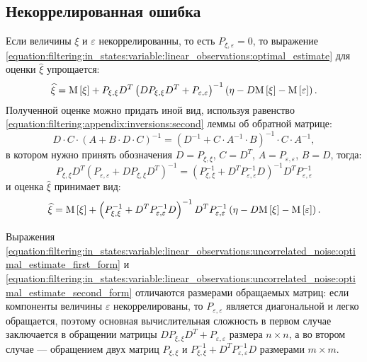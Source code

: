 \subsection{Некоррелированная ошибка}

Если величины $\xi$ и $\varepsilon$ некоррелированны, то есть $P_{\xi, \varepsilon} = 0$, то выражение
\eqref{equation:filtering:in_states:variable:linear_observations:optimal_estimate} для оценки $\widehat{\xi}$ упрощается:
\begin{gather} \label{equation:filtering:in_states:variable:linear_observations:uncorrelated_noise:optimal_estimate_first_form}
	\widehat{\xi}
		= \mathrm{M} \left [ \xi \right ]
		+ P_{\xi, \xi} D^T
			\left ( D P_{\xi, \xi} D^T + P_{\varepsilon, \varepsilon} \right )^{-1}
			\left ( \eta - D \mathrm{M} \left [ \xi \right ] - \mathrm{M} \left [ \varepsilon \right ] \right )
		.
\end{gather}
Полученной оценке можно придать иной вид, используя равенство \eqref{equation:filtering:appendix:inversions:second} леммы об обратной матрице:
$$
	D \cdot C \cdot \left ( A + B \cdot D \cdot C \right )^{-1} = \left ( D^{-1} + C \cdot A^{-1} \cdot B \right )^{-1} \cdot C \cdot A^{-1} ,
$$
в котором нужно принять обозначения $D = P_{\xi, \xi}$, $C = D^T$, $A = P_{\varepsilon, \varepsilon}$, $B = D$, тогда:
$$
	P_{\xi, \xi} D^T \left ( P_{\varepsilon, \varepsilon} + D P_{\xi, \xi} D^T \right )^{-1}
		= \left ( P_{\xi, \xi}^{-1} + D^T P_{\varepsilon, \varepsilon}^{-1} D \right )^{-1} D^T P_{\varepsilon, \varepsilon}^{-1}
$$
и оценка $\widehat{\xi}$ принимает вид:
\begin{gather} \label{equation:filtering:in_states:variable:linear_observations:uncorrelated_noise:optimal_estimate_second_form}
	\widehat{\xi}
		= \mathrm{M} \left [ \xi \right ]
		+ \left ( P_{\xi, \xi}^{-1} + D^T P_{\varepsilon, \varepsilon}^{-1} D \right )^{-1} D^T P_{\varepsilon, \varepsilon}^{-1} \left ( \eta - D \mathrm{M} \left [ \xi \right ] - \mathrm{M} \left [ \varepsilon \right ] \right )
		.
\end{gather}

Выражения \eqref{equation:filtering:in_states:variable:linear_observations:uncorrelated_noise:optimal_estimate_first_form} и
\eqref{equation:filtering:in_states:variable:linear_observations:uncorrelated_noise:optimal_estimate_second_form} отличаются размерами обращаемых матриц: если компоненты
величины $\varepsilon$ некоррелированы, то $P_{\varepsilon, \varepsilon}$ является диагональной и легко обращается, поэтому основная вычислительная сложность
в первом случае заключается в обращении матрицы $D P_{\xi, \xi} D^T + P_{\varepsilon, \varepsilon}$ размера $n \times n$, а во втором случае --- обращением двух
матриц $P_{\xi, \xi}$ и $P_{\xi, \xi}^{-1} + D^T P_{\varepsilon, \varepsilon}^{-1} D$ размерами $m \times m$.
